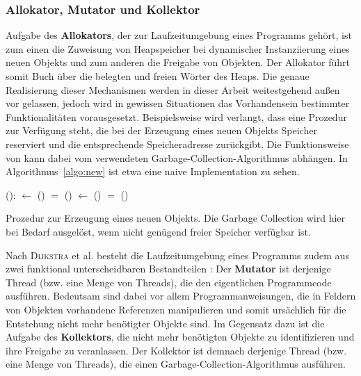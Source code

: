 \subsubsection*{Allokator, Mutator und Kollektor}
Aufgabe des \textbf{Allokators}, der zur Laufzeitumgebung eines Programms gehört, ist zum einen die Zuweisung von Heapspeicher bei dynamischer Instanziierung eines neuen Objekts und zum anderen die Freigabe von Objekten.
Der Allokator führt somit Buch über die belegten und freien Wörter des Heaps.
Die genaue Realisierung dieser Mechanismen werden in dieser Arbeit weitestgehend außen vor gelassen, jedoch wird in gewissen Situationen das Vorhandensein bestimmter Funktionalitäten vorausgesetzt.
Beispielsweise wird verlangt, dass eine Prozedur  zur Verfügung steht, die bei der Erzeugung eines neuen Objekts Speicher reserviert und die entsprechende Speicheradresse zurückgibt.
Die Funktionsweise von  kann dabei vom verwendeten Garbage-Collection-Algorithmus abhängen.
In Algorithmus~\ref{algo:new} ist etwa eine naive Implementation zu sehen.

\begin{algorithm}
\begin{algorithmic}[1]
	\State {}():
	\State \quad {} $\gets$ ()		
	\State \quad \IF {} $=$ \Null		{}
	\State \quad \quad {}()	
	\State \quad \quad {} $\gets$ ()	
	\State \quad \quad \IF {} $=$ \Null
	\State \quad \quad \quad {}()
	\State \quad \Return {}
\end{algorithmic}
\caption[Prozedur  zur Erzeugung eines neuen Objekts]{Prozedur  zur Erzeugung eines neuen Objekts. Die Garbage Collection wird hier bei Bedarf ausgelöst, wenn nicht genügend freier Speicher verfügbar ist.}
\label{algo:new}
\end{algorithm}

Nach \textsc{Dijkstra} et al. besteht die Laufzeitumgebung eines Programms zudem aus zwei funktional unterscheidbaren Bestandteilen \cite[S. 967]{dijkstra1978}:
Der \textbf{Mutator} ist derjenige Thread (bzw. eine Menge von Threads), die den eigentlichen Programmcode ausführen.
Bedeutsam sind dabei vor allem Programmanweisungen, die in Feldern von Objekten vorhandene Referenzen manipulieren und somit ursächlich für die Entstehung nicht mehr benötigter Objekte sind.
Im Gegensatz dazu ist die Aufgabe des \textbf{Kollektors}, die nicht mehr benötigten Objekte zu identifizieren und ihre Freigabe zu veranlassen.
Der Kollektor ist demnach derjenige Thread (bzw. eine Menge von Threads), die einen Garbage-Collection-Algorithmus ausführen.


